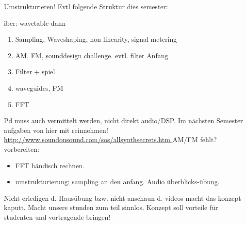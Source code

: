 
\label{introduction}


Umstrukturieren!
Evtl folgende Struktur dies semester:

iber: wavetable
dann
\begin{enumerate}
	\item Sampling, Waveshaping, non-linearity, signal metering
	\item AM, FM, sounddesign challenge. evtl. filter Anfang
	\item Filter + spiel
	\item waveguides, PM
	\item FFT

\end{enumerate}


Pd muss auch vermittelt werden, nicht direkt audio/DSP.
Im nächsten Semester aufgaben von hier mit reinnehmen!
\url{
http://www.soundonsound.com/sos/allsynthsecrets.htm
}
AM/FM fehlt?
vorbereiten:
\begin{itemize}
	\item FFT händisch rechnen.
	\item umstrukturierung: sampling an den anfang. Audio überblicks-übung.
\end{itemize}

\label{sub:inverted_classroom}

Nicht erledigen d. Hausübung bzw. nicht anschaun d. videos macht das konzept kaputt. Macht unsere stunden zum teil sinnlos.
Konzept soll vorteile für studenten und vortragende bringen!





